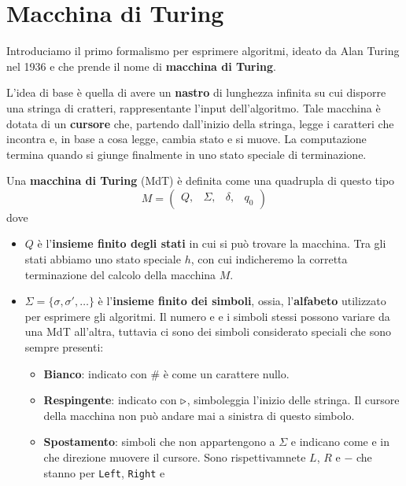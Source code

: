 \section{Macchina di Turing}
Introduciamo il primo formalismo per esprimere algoritmi, ideato
da Alan Turing nel 1936 e che prende il nome di
\textbf{macchina di Turing}.

L'idea di base è quella di avere un \textbf{nastro} di lunghezza
infinita su cui disporre una stringa di cratteri, rappresentante
l'input dell'algoritmo. Tale macchina è dotata di un
\textbf{cursore} che, partendo dall'inizio della stringa, legge
i caratteri che incontra e, in base a cosa legge, cambia stato
e si muove. La computazione termina quando si giunge finalmente
in uno stato speciale di terminazione.

\begin{definition}
	Una \textbf{macchina di Turing} (MdT) è definita come una
	quadrupla di questo tipo
	\[
		M = \begin{pmatrix}
			Q, & \Sigma, & \delta, & q_0
		\end{pmatrix}
	\]
	dove
	\begin{itemize}
		\item $Q$ è l'\textbf{insieme finito degli stati} in
		      cui si può trovare la macchina. Tra gli stati
		      abbiamo uno stato speciale $h$, con cui
		      indicheremo la corretta terminazione del calcolo
		      della macchina $M$.
		\item $\Sigma = \{ \sigma, \sigma', \dots \}$ è
		      l'\textbf{insieme finito dei simboli}, ossia,
		      l'\textbf{alfabeto} utilizzato per esprimere
		      gli algoritmi. Il numero e e i simboli stessi
		      possono variare da una MdT all'altra, tuttavia
		      ci sono dei simboli considerato speciali che sono
		      sempre presenti:
		      \begin{itemize}
			      \item \textbf{Bianco}: indicato con $\#$ è
			            come un carattere nullo.
			      \item \textbf{Respingente}: indicato con
			            $\triangleright$, simboleggia l'inizio delle
			            stringa. Il cursore della macchina non
			            può andare mai a sinistra di questo
			            simbolo.
			      \item \textbf{Spostamento}: simboli che non
			            appartengono a $\Sigma$ e indicano come
			            e in che direzione muovere il cursore.
			            Sono rispettivamnete $L$, $R$ e $-$ che
			            stanno per \verb|Left|, \verb|Right| e

\end{itemize}
\end{itemize}
\end{definition}
